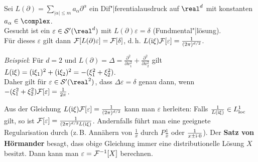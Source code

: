 Sei $L(\partial) = \sum_{|\alpha| \le m} a_\alpha \partial^\alpha$ ein
Dif"|ferentialausdruck auf $\real^d$ mit konstanten $a_\alpha \in \complex$.\\
Gesucht ist ein $\varepsilon \in \S'(\real^d)$ mit
$L(\partial)\varepsilon = \delta$ (Fundmental"|lösung).\\
Für dieses $\varepsilon$ gilt dann $\mathcal{F}[L(\partial)\varepsilon] = \mathcal{F}[\delta]$,
d.\,h. $L(\mathrm{i}\xi) \mathcal{F}[\varepsilon] = \frac{1}{(2\pi)^{d/2}}$.

\emph{Beispiel}:
Für $d = 2$ und $L(\partial) = \Delta = \frac{\partial^2}{\partial x_1^2} +
\frac{\partial^2}{\partial x_2^2}$ gilt
$L(\mathrm{i}\xi) = (\mathrm{i}\xi_1)^2 + (\mathrm{i}\xi_2)^2 = -(\xi_1^2 + \xi_2^2)$.\\
Daher gilt für $\varepsilon \in \S'(\real^2)$, dass
$\Delta \varepsilon = \delta$ genau dann, wenn
$-(\xi_1^2 + \xi_2^2) \mathcal{F}[\varepsilon] = \frac{1}{2\pi}$.

Aus der Gleichung $L(\mathrm{i}\xi) \mathcal{F}[\varepsilon] = \frac{1}{(2\pi)^{d/2}}$
kann man $\varepsilon$ herleiten:
Falls $\frac{1}{L(\mathrm{i}\xi)} \in L^1_{{\operatorname{loc}}}$ gilt, so ist
$\mathcal{F}[\varepsilon] = \frac{1}{(2\pi)^{d/2} L(\mathrm{i}\xi)}$.
Andernfalls führt man eine geeignete Regularisation durch
(z.\,B. Annähern von $\frac{1}{x}$ durch $P\frac{1}{x}$ oder
$\frac{1}{x \pm \mathrm{i} \cdot 0}$).
Der \textbf{Satz von Hörmander} besagt, dass
obige Gleichung immer eine distributionelle Lösung $X$ besitzt.
Dann kann man $\varepsilon = \mathcal{F}^{-1}[X]$ berechnen.

\linie

